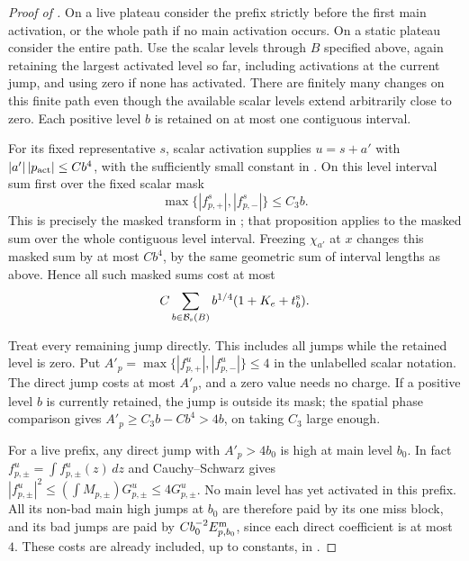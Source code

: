 \begin{proof}[Proof of ]
On a live plateau consider the prefix strictly before the first main
activation, or the whole path if no main activation occurs.  On a static
plateau consider the entire path.  Use the scalar levels through $B$
specified above, again retaining the largest activated level so far,
including activations at the current jump, and using zero if none has
activated.  There are finitely many changes
on this finite path even though the available scalar levels extend
arbitrarily close to zero.  Each positive level $b$ is retained on at
most one contiguous interval.

For its fixed representative $s$, scalar activation supplies
$u=s+a'$ with $|a'|\,|p_{\rm act}|\le Cb^4$, with the sufficiently
small constant in .  On this level interval sum first
over the fixed scalar mask
\[
 \max\{|f_{p,+}^s|,|f_{p,-}^s|\}\le C_3b.
\]
This is precisely the masked transform in ; that
proposition applies to the masked sum over the whole contiguous level
interval.  Freezing $\chi_{a'}$ at $x$ changes this masked sum by at most
$Cb^4$, by the same geometric sum of interval lengths as above.  Hence
all such masked sums cost at most
\begin{equation}\label{eq:09-scalar-mask-sum}
 C\sum_{b\in\mathcal B_{\rm s}(B)}b^{1/4}
                         (1+K_e+t_b^{\rm s}).
\end{equation}

Treat every remaining jump directly.  This includes all jumps while the
retained level is zero.  Put
$A'_p=\max\{|f_{p,+}^u|,|f_{p,-}^u|\}\le4$ in the unlabelled scalar
notation.  The direct jump costs at most $A'_p$, and a zero value needs
no charge.  If a positive level $b$ is currently retained, the jump is
outside its mask; the spatial phase comparison gives
$A'_p\ge C_3b-Cb^4>4b$, on taking $C_3$ large enough.

For a live prefix, any direct jump with $A'_p>4b_0$ is high at main
level $b_0$.  In fact $f_{p,\pm}^u=\int f_{p,\pm}^u(z)\,dz$ and
Cauchy--Schwarz gives
$|f_{p,\pm}^u|^2\le(\int M_{p,\pm})G_{p,\pm}^u\le4G_{p,\pm}^u$.
No main level has yet activated in this prefix.  All its non-bad main
high jumps at $b_0$ are therefore paid by its one miss block, and its
bad jumps are paid by
$C b_0^{-2}E_{p,b_0}^{\rm m}$, since each direct coefficient is at most
$4$.  These costs are already included, up to constants, in
.


\end{proof}
